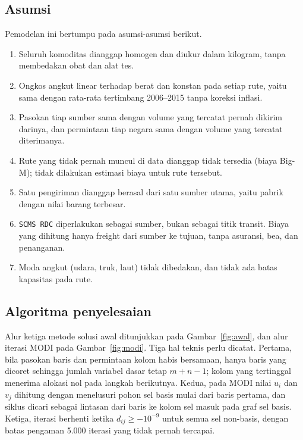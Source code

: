 \documentclass[a4paper,11pt]{article}
\begin{document}
\subsection{Asumsi}
Pemodelan ini bertumpu pada asumsi-asumsi berikut.
\begin{enumerate}
\item Seluruh komoditas dianggap homogen dan diukur dalam kilogram, tanpa membedakan obat dan alat tes.
\item Ongkos angkut linear terhadap berat dan konstan pada setiap rute, yaitu sama dengan rata-rata tertimbang 2006--2015 tanpa koreksi inflasi.
\item Pasokan tiap sumber sama dengan volume yang tercatat pernah dikirim darinya, dan permintaan tiap negara sama dengan volume yang tercatat diterimanya.
\item Rute yang tidak pernah muncul di data dianggap tidak tersedia (biaya Big-M); tidak dilakukan estimasi biaya untuk rute tersebut.
\item Satu pengiriman dianggap berasal dari satu sumber utama, yaitu pabrik dengan nilai barang terbesar.
\item \texttt{SCMS RDC} diperlakukan sebagai sumber, bukan sebagai titik transit. Biaya yang dihitung hanya freight dari sumber ke tujuan, tanpa asuransi, bea, dan penanganan.
\item Moda angkut (udara, truk, laut) tidak dibedakan, dan tidak ada batas kapasitas pada rute.
\end{enumerate}

\subsection{Algoritma penyelesaian}
Alur ketiga metode solusi awal ditunjukkan pada Gambar~\ref{fig:awal}, dan alur iterasi MODI pada Gambar~\ref{fig:modi}. Tiga hal teknis perlu dicatat. Pertama, bila pasokan baris dan permintaan kolom habis bersamaan, hanya baris yang dicoret sehingga jumlah variabel dasar tetap $m+n-1$; kolom yang tertinggal menerima alokasi nol pada langkah berikutnya. Kedua, pada MODI nilai $u_i$ dan $v_j$ dihitung dengan menelusuri pohon sel basis mulai dari baris pertama, dan siklus dicari sebagai lintasan dari baris ke kolom sel masuk pada graf sel basis. Ketiga, iterasi berhenti ketika $d_{ij}\ge -10^{-9}$ untuk semua sel non-basis, dengan batas pengaman 5.000 iterasi yang tidak pernah tercapai.
\end{document}
